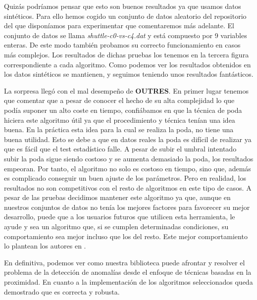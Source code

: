 Quizás podríamos pensar que esto son buenos resultados ya que usamos datos 
sintéticos. Para ello hemos cogido un conjunto de datos aleatorio del repositorio del
que disponíamos para experimentar que comentaremos más adelante. El conjunto de
datos se llama \textit{shuttle-c0-vs-c4.dat} y está compuesto por 9 variables enteras.
De este modo también probamos su correcto funcionamiento en casos más complejos.
Los resultados de dichas pruebas los tenemos en la tercera figura correspondiente a cada
algoritmo. Como podemos ver los resultados obtenidos en los datos sintéticos se mantienen,
y seguimos teniendo unos resultados fantásticos.

La sorpresa llegó con el mal desempeño de \textbf{OUTRES}. En primer lugar
tenemos que comentar que a pesar de conocer el hecho de su alta complejidad lo que podía
suponer un alto coste en tiempo, confiábamos en que la técnica de poda hiciera este algoritmo
útil ya que el procedimiento y técnica tenían una idea buena. En la práctica esta idea 
para la cual se realiza la poda, no tiene una buena utilidad. Esto se debe a que en datos 
reales la poda es difícil de realizar ya que es fácil que el test estadístico falle. A pesar de
subir el umbral intentado subir la poda sigue siendo costoso y se aumenta demasiado la poda, los
resultados empeoran. Por tanto, el algoritmo no solo es costoso en tiempo, sino que, además
es complicado conseguir un buen ajuste de los parámetros. Pero en realidad, los
resultados no son competitivos con el resto de algoritmos en este tipo de casos. A pesar de las pruebas
decidimos mantener este algoritmo ya que, aunque en nuestros conjuntos de datos no tenía los mejores factores 
para favorecer su mejor desarrollo, puede que a los usuarios futuros que utilicen
esta herramienta, le ayude y sea un algoritmo que, si se cumplen determinadas condiciones, su comportamiento
sea mejor incluso que los del resto. Este mejor comportamiento lo plantean los autores en 
\cite{mullerAdaptiveOutliernessSubspace2010}. 


En definitiva, podemos ver como nuestra biblioteca
puede afrontar y resolver el problema de la detección de anomalías
desde el enfoque de técnicas basadas en la proximidad. En cuanto a la implementación
de los algoritmos seleccionados queda demostrado que es correcta y robusta.




